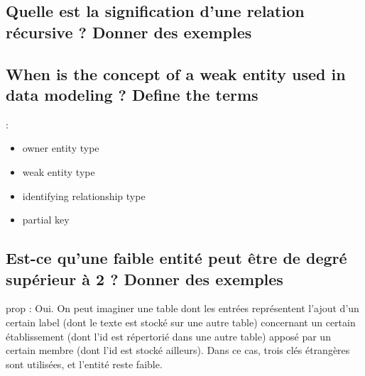 
\subsection{Quelle est la signification d'une relation récursive ? Donner des exemples}

\subsection{When is the concept of a weak entity used in data modeling ? Define the terms} :
\begin{itemize}
	\item owner entity type
	\item weak entity type
	\item identifying relationship type
	\item partial key
\end{itemize}

\subsection{Est-ce qu'une faible entité peut être de degré supérieur à 2 ? Donner des exemples}
prop :
Oui. On peut imaginer une table dont les entrées représentent l'ajout d'un certain label (dont le texte est stocké sur une autre table) 
concernant un certain établissement (dont l'id est répertorié dans une autre table) apposé par un certain membre 
(dont l'id est stocké ailleurs). Dans ce cas, 
trois clés étrangères sont utilisées, et l'entité reste faible.

